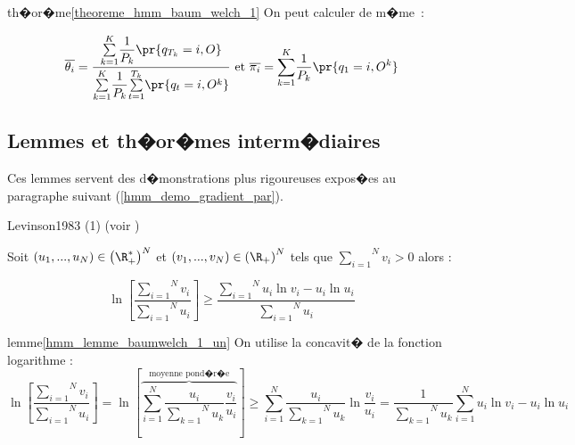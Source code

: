 \begin{xdemo}{th�or�me}{\ref{theoreme_hmm_baum_welch_1}}
On peut calculer de m�me~:

        $$
        \overline{\theta_{i}}=\dfrac{\underset {k=1}{\overset{K}{\sum}}\dfrac{1}{P_{k}} \pr{  q_{T_{k}}=i,O}
        }{\underset{k=1}{\overset{K}{\sum}}\dfrac{1}{P_{k}}\underset{t=1}
         {\overset{T_{k}}{\sum}} \pr{  q_{t}=i,O^{k}}  } \text{ et }\overline{\pi
        _{i}}=\underset{k=1}{\overset{K}{ {\displaystyle\sum} }}\dfrac{1}{P_{k}} \pr{  q_{1}=i,O^{k}}
        $$

\end{xdemo}












\subsection{Lemmes et th�or�mes interm�diaires}

Ces lemmes servent des d�monstrations plus rigoureuses expos�es au paragraphe suivant (\ref{hmm_demo_gradient_par}).


            \begin{xlemma}{Levinson1983 (1)}\label{hmm_lemme_baumwelch_1_un} (voir )
            
            Soit $\left(  u_{1},...,u_{N}\right)  \in\left( \R_{+}^{\ast}\right)  ^{N}$ et
             $\left(  v_{1},...,v_{N}\right) \in\left( \R_{+}\right) ^{N}$ tels que $\overset{N}{\underset {i=1}{\sum}}v_{i}>0$ alors :
            
                    $$
                    \ln\left[  \frac{\overset{N}{\underset{i=1}{\sum}}v_{i}}{\overset{N}{\underset{i=1}{\sum}}
                                u_{i}}\right]  \geqslant\dfrac{\overset
                    {N}{\underset{i=1}{\sum}}u_{i}\ln v_{i}-u_{i}\ln u_{i}}{\overset{N} {\underset{i=1}{\sum}}u_{i}}
                    $$
                    
            \end{xlemma}

\begin{xdemo}{lemme}{\ref{hmm_lemme_baumwelch_1_un}}
On utilise la concavit� de la fonction logarithme :
        $$
        \ln\left[  \frac{\overset{N}{\underset{i=1}{\sum}}v_{i}}{\overset
        {N}{\underset{i=1}{\sum}}u_{i}}\right]  =\ln\left[  \overset{\text{moyenne
        pond�r�e}}{\overbrace{\overset{N}{\underset{i=1}{\sum}}\frac{u_{i}%
        }{\overset{N}{\underset{k=1}{\sum}}u_{k}}\dfrac{v_{i}}{u_{i}}}}\right]
        \geqslant\overset{N}{\underset{i=1}{\sum}}\frac{u_{i}}{\overset{N}%
        {\underset{k=1}{\sum}}u_{k}}\ln\dfrac{v_{i}}{u_{i}}=\frac{1}{\overset
         {N}{\underset{k=1}{\sum}}u_{k}}\overset{N}{\underset{i=1}{\sum}}u_{i}\ln
        v_{i}-u_{i}\ln u_{i}
        $$
\end{xdemo}









